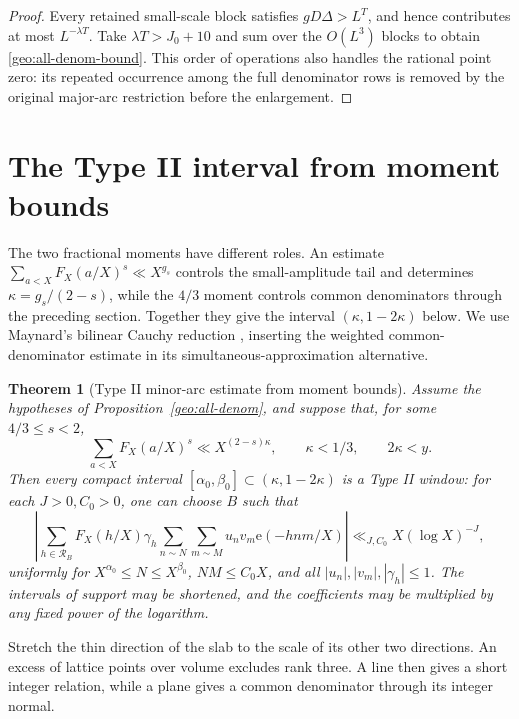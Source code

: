 \documentclass[11pt,a4paper]{article}
\theoremstyle{paperplain}
\newtheorem{theorem}{Theorem}[section]
\numberwithin{equation}{section}
\begin{document}
\begin{proof}
Every retained small-scale block satisfies $gD\Delta>L^T$, and hence
contributes at most $L^{-\lambda T}$.
Take $\lambda T>J_0+10$ and sum over the $O(L^3)$ blocks to obtain
\eqref{geo:all-denom-bound}.
This order of operations also handles the rational point zero:
its repeated occurrence among the full denominator rows is removed by the
original major-arc restriction before the enlargement.
\end{proof}

\section{The Type II interval from moment bounds}\label{geo:typeii-section}

The two fractional moments have different roles. An estimate
$\sum_{a<X}F_X(a/X)^s\ll X^{g_s}$ controls the small-amplitude tail
and determines $\kappa=g_s/(2-s)$, while the
$4/3$ moment controls common denominators through the preceding section.
Together they give the interval $(\kappa,1-2\kappa)$ below. We use
Maynard's bilinear Cauchy reduction \cite[\S13]{Maynard2019}, inserting
the weighted common-denominator estimate in its simultaneous-approximation
alternative.

\begin{theorem}[Type II minor-arc estimate from moment bounds]\label{geo:typeii}
Assume the hypotheses of Proposition~\ref{geo:all-denom}, and suppose that,
for some $4/3\le s<2$,
\begin{equation}\label{geo:fractional}
 \sum_{a<X}F_X(a/X)^s\ll X^{(2-s)\kappa},\qquad
 \kappa<1/3,\qquad 2\kappa<y.
\end{equation}
Then every compact interval
$[\alpha_0,\beta_0]\subset(\kappa,1-2\kappa)$
is a Type II window: for each $J>0,C_0>0$, one can choose $B$ such that
\begin{equation}\label{geo:typeii-bound}
 \left|\sum_{h\in\mathcal R_B}F_X(h/X)\gamma_h
 \sum_{n\sim N}\sum_{m\sim M}u_nv_m\mathrm e(-hnm/X)\right|
 \ll_{J,C_0}X(\log X)^{-J},
\end{equation}
uniformly for $X^{\alpha_0}\le N\le X^{\beta_0}$, $NM\le C_0X$,
and all $|u_n|,|v_m|,|\gamma_h|\le1$.
The intervals of support may be shortened, and the coefficients may be
multiplied by any fixed power of the logarithm.
\end{theorem}

Stretch the thin direction of the slab to the scale of its other two
directions. An excess of lattice points over volume excludes rank three.
A line then gives a short integer relation, while a plane gives a common
denominator through its integer normal.
\end{document}
